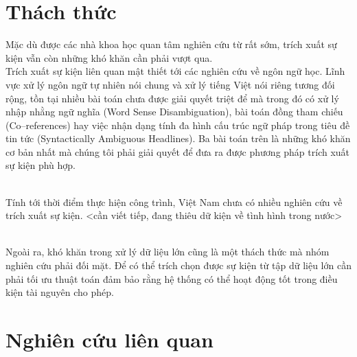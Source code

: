  \section{Thách thức}
   \noindent  Mặc dù được các nhà khoa học quan tâm nghiên cứu  từ rất sớm, trích xuất sự kiện vẫn còn những khó khăn cần phải vượt qua. \\
\noindent Trích xuất sự kiện liên quan mật thiết tới các nghiên cứu về ngôn ngữ học. Lĩnh vực xử lý ngôn ngữ tự nhiên nói chung và xử lý tiếng Việt nói riêng tương đối rộng, tồn tại nhiều bài toán chưa được giải quyết triệt để mà trong đó có  xử lý nhập nhằng ngữ nghĩa (Word Sense Disambiguation), bài toán đồng tham chiếu (Co--references) hay việc nhận dạng tính đa hình cấu trúc ngữ pháp trong tiêu đề tin tức (Syntactically  Ambiguous Headlines). Ba bài toán trên là những khó khăn cơ bản nhất mà chúng tôi phải giải quyết để đưa ra được phương pháp trích xuất sự kiện phù hợp.

\\
\noindent Tính tới thời điểm thực hiện công trình, Việt Nam chưa có nhiều nghiên cứu về trích xuất sự kiện. <cần viết tiếp, đang thiêu dữ kiện về tình hình trong nước>

\\
\noindent Ngoài ra, khó khăn trong xử lý dữ liệu lớn cũng là một thách thức mà nhóm nghiên cứu phải đối mặt. Để có thể trích chọn được sự kiện từ tập dữ liệu lớn cần phải tối ưu thuật toán đảm bảo rằng hệ thống có thể hoạt động tốt trong điều kiện tài nguyên cho phép.


\section{Nghiên cứu liên quan}
